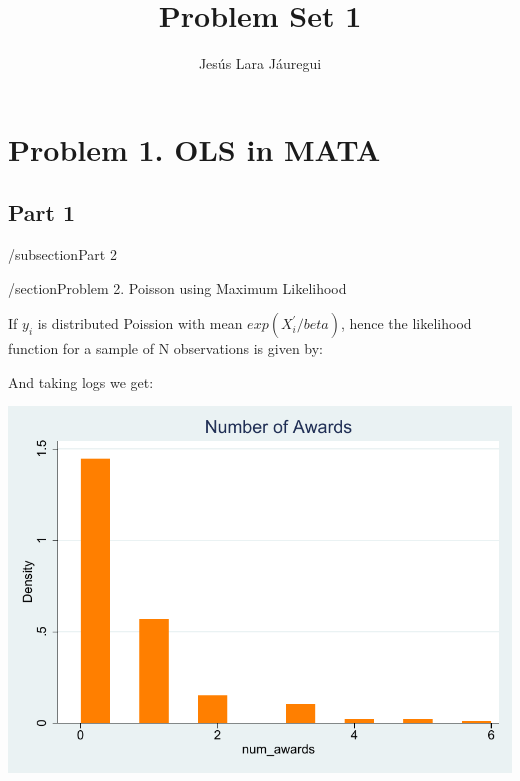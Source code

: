 \documentclass[12pt]{article}
\begin{document}
\author{Jesús Lara Jáuregui}
\title{Problem Set 1}
\maketitle



\section{Problem 1. OLS in MATA}
\subsection{Part 1}



\begin{stlog}\end{stlog}
/subsection{Part 2}
\begin{stlog}\end{stlog}

/section{Problem 2. Poisson using Maximum Likelihood}

If $y_i$ is distributed Poission with mean $exp(X^{'}_i /beta)$, hence the likelihood function for a sample of N observations is given by:

And taking logs we get:

\begin{stlog}\end{stlog}
\begin{center}
    \includegraphics{797B_PS1_JL_3.pdf}
\end{center}
\end{document}

